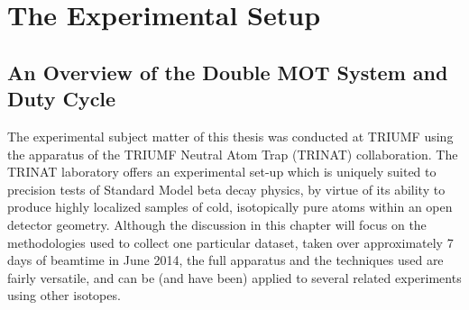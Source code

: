 %
%
%
\clearpage
\chapter{The Experimental Setup}
\label{experimental_chapter}
\section{An Overview of the Double MOT System and Duty Cycle}
\label{section:overview}
\label{setup_chapter}
%


The experimental subject matter of this thesis was conducted at TRIUMF using the apparatus of the TRIUMF Neutral Atom Trap (TRINAT) collaboration.  The TRINAT laboratory offers an experimental set-up which is uniquely suited to precision tests of Standard Model beta decay physics, by virtue of its ability to produce highly localized samples of cold, isotopically pure atoms within an open detector geometry.    Although the discussion in this chapter will focus on the methodologies used to collect one particular dataset, taken over approximately 7 days of beamtime in June 2014, the full apparatus and the techniques used are fairly versatile, and can be (and have been) applied to
several related experiments using other isotopes.

